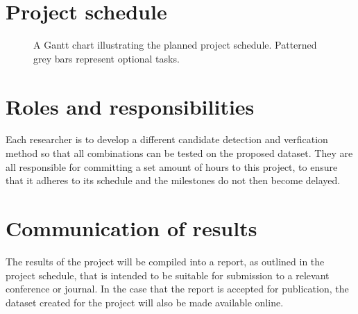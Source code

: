 \documentclass[11pt]{scrartcl}
\begin{document}
	\section{Project schedule} {


		\begin{figure}[H]
	        \makebox[\textwidth][c]{\resizebox{0.95\paperwidth}{!}{}}
			\caption[Project Schedule] {
                A Gantt chart illustrating the planned project schedule.
                Patterned grey bars represent optional tasks.
			}
			\label{gantt:proposal}
		\end{figure}

	}

	\section{Roles and responsibilities} {

		Each researcher is to develop a different candidate detection and
		verfication method so that all combinations can be tested on the 
		proposed dataset. They are all responsible for committing a set 
		amount of hours to this project, to ensure that it adheres to its
		schedule and the milestones do not then become delayed.

    }

    \section{Communication of results} {

        The results of the project will be compiled into a report, as outlined
        in the project schedule, that is intended to be suitable for
        submission to a relevant conference or journal. In the case that the
        report is accepted for publication, the dataset created for the
        project will also be made available online.
        
    }

	
	
\end{document}
